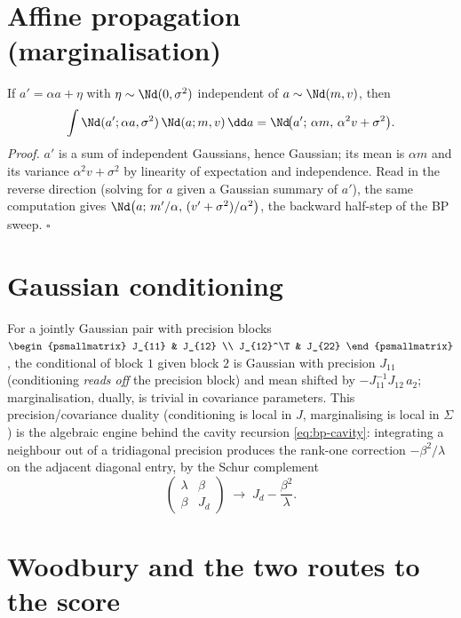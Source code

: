 \section{Affine propagation (marginalisation)}

If $a' = \alpha a + \eta$ with $\eta \sim \Nd(0, \sigma^2)$ independent of
$a \sim \Nd(m, v)$, then
\begin{equation}
  \int \Nd(a'; \alpha a, \sigma^2)\, \Nd(a; m, v)\, \dd a
  = \Nd\!\big(a';\, \alpha m,\, \alpha^2 v + \sigma^2\big).
  \label{eq:gauss-predict}
\end{equation}
\emph{Proof.} $a'$ is a sum of independent Gaussians, hence Gaussian; its
mean is $\alpha m$ and its variance $\alpha^2 v + \sigma^2$ by linearity
of expectation and independence. Read in the reverse direction (solving
for $a$ given a Gaussian summary of $a'$), the same computation gives
$\Nd\big(a;\, m'/\alpha,\, (v' + \sigma^2)/\alpha^2\big)$, the backward
half-step of the BP sweep. $\square$

\section{Gaussian conditioning}

For a jointly Gaussian pair with precision blocks
$\begin{psmallmatrix} J_{11} & J_{12} \\ J_{12}^\T & J_{22}
\end{psmallmatrix}$, the conditional of block $1$ given block $2$ is
Gaussian with precision $J_{11}$ (conditioning \emph{reads off} the
precision block) and mean shifted by $-J_{11}^{-1} J_{12}\, a_2$;
marginalisation, dually, is trivial in covariance parameters. This
precision/covariance duality (conditioning is local in $J$,
marginalising is local in $\Sigma$) is the algebraic engine behind the
cavity recursion \eqref{eq:bp-cavity}: integrating a neighbour out of a
tridiagonal precision produces the rank-one correction
$-\beta^2/\lambda$ on the adjacent diagonal entry, by the Schur
complement
\begin{equation}
  \begin{pmatrix} \lambda & \beta \\ \beta & J_d \end{pmatrix}
  \;\longrightarrow\;
  J_d - \frac{\beta^2}{\lambda}.
  \label{eq:gauss-schur}
\end{equation}

\section{Woodbury and the two routes to the score}

